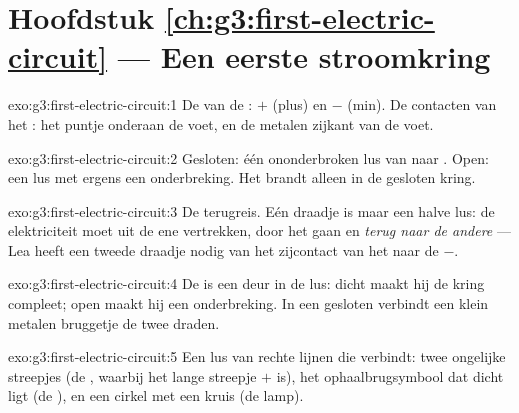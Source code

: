 \section*{Hoofdstuk \ref{ch:g3:first-electric-circuit} --- Een eerste stroomkring}

\begin{solution}{exo:g3:first-electric-circuit:1}
De  van de : $+$ (plus) en $-$ (min). De contacten van
het : het puntje onderaan de voet, en de metalen zijkant van de
voet.
\end{solution}

\begin{solution}{exo:g3:first-electric-circuit:2}
Gesloten: één ononderbroken lus van  naar . Open: een lus
met ergens een onderbreking. Het  brandt alleen in de gesloten
kring.
\end{solution}

\begin{solution}{exo:g3:first-electric-circuit:3}
De terugreis. Eén draadje is maar een halve lus: de elektriciteit moet
uit de ene  vertrekken, door het  gaan en \emph{terug naar de
andere } --- Lea heeft een tweede draadje nodig van het
zijcontact van het  naar de $-$.
\end{solution}

\begin{solution}{exo:g3:first-electric-circuit:4}
De  is een deur in de lus: dicht maakt hij de kring
compleet; open maakt hij een onderbreking. In een gesloten
 verbindt een klein metalen bruggetje de twee draden.
\end{solution}

\begin{solution}{exo:g3:first-electric-circuit:5}
Een lus van rechte lijnen die verbindt: twee ongelijke streepjes (de
, waarbij het lange streepje $+$ is), het
ophaalbrugsymbool dat dicht ligt (de ), en een cirkel met een
kruis (de lamp).
\end{solution}

